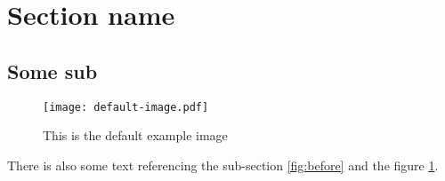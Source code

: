 \section{Section name}
\label{sec:section}

\subsection{Some sub}
\label{ssec:subsection}

\begin{figure}
	\centering\texttt{[image: default-image.pdf]}
	\label{fig:before}
	\caption{This is the default example image}
	\label{fig:after}
\end{figure}

There is also some text referencing the sub-section \ref{fig:before} and the figure \ref{fig:after}.
